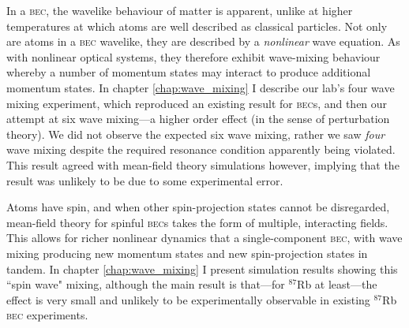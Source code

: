 In a \textsc{bec}, the wavelike behaviour of matter is apparent, unlike at higher temperatures at which atoms are well described as classical particles. Not only are atoms in a \textsc{bec} wavelike, they are described by a \emph{nonlinear} wave equation. As with nonlinear optical systems, they therefore exhibit wave-mixing behaviour whereby a number of momentum states may interact to produce additional momentum states. In chapter \ref{chap:wave_mixing} I describe our lab's four wave mixing experiment, which reproduced an existing result for \textsc{bec}s, and then our attempt at six wave mixing---a higher order effect (in the sense of perturbation theory). We did not observe the expected six wave mixing, rather we saw \emph{four} wave mixing despite the required resonance condition apparently being violated. This result agreed with mean-field theory  simulations however, implying that the result was unlikely to be due to some experimental error.

Atoms have spin, and when other spin-projection states cannot be disregarded, mean-field theory for spinful \textsc{bec}s takes the form of multiple, interacting fields. This allows for richer nonlinear dynamics that a single-component \textsc{bec}, with wave mixing producing new momentum states and new spin-projection states in tandem. In chapter \ref{chap:wave_mixing} I present simulation results showing this ``spin wave" mixing, although the main result is that---for $^{87}$Rb at least---the effect is very small and unlikely to be experimentally observable in existing $^{87}$Rb \textsc{bec} experiments.

